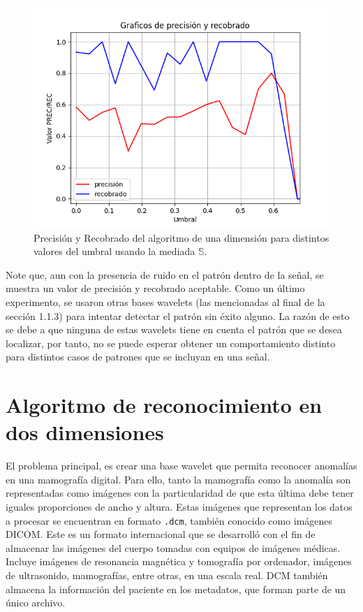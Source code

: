 \begin{figure}[h]
\center
\includegraphics[scale=.45]{Graphics/PrecRec1D.png}
\caption{Precisi\'on y Recobrado del algoritmo de una dimensi\'on para distintos valores del umbral usando la mediada $\mathbb{S}$.}
\end{figure}

\par Note que, aun con la presencia de ruido en el patr\'on dentro de la se\~nal, se muestra un valor de precisi\'on y recobrado aceptable. Como un \'ultimo experimento, se usaron otras bases wavelets (las mencionadas al final de la secci\'on 1.1.3) para intentar detectar el patr\'on sin \'exito alguno. La raz\'on de esto se debe a que ninguna de estas wavelets tiene en cuenta el patr\'on que se desea localizar, por tanto, no se puede esperar obtener un comportamiento distinto para distintos casos de patrones que se incluyan en una se\~nal.

\section{Algoritmo de reconocimiento en dos dimensiones}

\par El problema principal, es crear una base wavelet que permita reconocer anomal\'ias en una mamograf\'ia digital. Para ello, tanto la mamograf\'ia como la anomal\'ia son representadas como im\'agenes con la particularidad de que esta \'ultima debe tener iguales proporciones de ancho y altura. Estas im\'agenes que representan los datos a procesar se encuentran en formato \texttt{.dcm}, tambi\'en conocido como im\'agenes DICOM. Este es un formato internacional que se desarrolló con el fin de almacenar las imágenes del cuerpo tomadas con equipos de imágenes médicas. Incluye imágenes de resonancia magnética y tomografía por ordenador, imágenes de ultrasonido, mamograf\'ias, entre otras, en una escala real. DCM también almacena la información del paciente en los metadatos, que forman parte de un único archivo.\\

